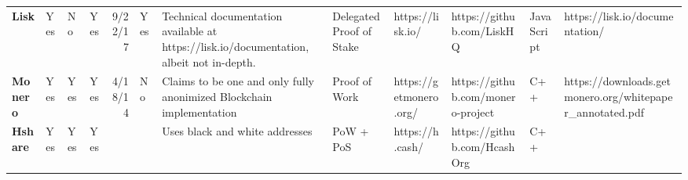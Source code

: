 \begin{table}[ht]
\begin{adjustbox}{width=25cm, height=6cm, angle=270}
\begin{tabular}{llllrlp{17.915em}rlrrr}
      \rowcolor[rgb]{ .267,  .447,  .769} \textcolor[rgb]{ 1,  1,  1}{\textbf{Lisk}} & \cellcolor[rgb]{ .776,  .937,  .808}\textcolor[rgb]{ 0,  .38,  0}{Yes} & \cellcolor[rgb]{ 1,  .78,  .808}\textcolor[rgb]{ .612,  0,  .024}{No} & \cellcolor[rgb]{ .776,  .937,  .808}\textcolor[rgb]{ 0,  .38,  0}{Yes} & \cellcolor[rgb]{ 1,  1,  1}9/22/17 & \cellcolor[rgb]{ .776,  .937,  .808}\textcolor[rgb]{ 0,  .38,  0}{Yes} & \cellcolor[rgb]{ .851,  .882,  .949}\textcolor[rgb]{ .188,  .329,  .588}{Technical documentation available at https://lisk.io/documentation, albeit not in-depth.} & \multicolumn{1}{l}{\cellcolor[rgb]{ .851,  .882,  .949}\textcolor[rgb]{ .188,  .329,  .588}{Delegated Proof of Stake}} & \cellcolor[rgb]{ 1,  1,  1}https://lisk.io/ & \multicolumn{1}{l}{\cellcolor[rgb]{ 1,  1,  1}https://github.com/LiskHQ} & \multicolumn{1}{l}{\cellcolor[rgb]{ .851,  .882,  .949}\textcolor[rgb]{ .188,  .329,  .588}{JavaScript}} & \multicolumn{1}{l}{\cellcolor[rgb]{ 1,  1,  1}https://lisk.io/documentation/} \\
      \rowcolor[rgb]{ .267,  .447,  .769} \textcolor[rgb]{ 1,  1,  1}{\textbf{Monero}} & \cellcolor[rgb]{ .776,  .937,  .808}\textcolor[rgb]{ 0,  .38,  0}{Yes} & \cellcolor[rgb]{ .776,  .937,  .808}\textcolor[rgb]{ 0,  .38,  0}{Yes} & \cellcolor[rgb]{ .776,  .937,  .808}\textcolor[rgb]{ 0,  .38,  0}{Yes} & \cellcolor[rgb]{ .851,  .882,  .949}\textcolor[rgb]{ .188,  .329,  .588}{4/18/14} & \cellcolor[rgb]{ 1,  .78,  .808}\textcolor[rgb]{ .612,  0,  .024}{No} & \cellcolor[rgb]{ 1,  1,  1}\textcolor[rgb]{ .188,  .329,  .588}{Claims to be one and only fully anonimized Blockchain implementation} & \multicolumn{1}{l}{\cellcolor[rgb]{ .851,  .882,  .949}\textcolor[rgb]{ .188,  .329,  .588}{Proof of Work}} & \cellcolor[rgb]{ .851,  .882,  .949}\textcolor[rgb]{ .188,  .329,  .588}{https://getmonero.org/} & \multicolumn{1}{l}{\cellcolor[rgb]{ .851,  .882,  .949}\textcolor[rgb]{ .188,  .329,  .588}{https://github.com/monero-project}} & \multicolumn{1}{l}{\cellcolor[rgb]{ .851,  .882,  .949}\textcolor[rgb]{ .188,  .329,  .588}{C++}} & \multicolumn{1}{l}{\cellcolor[rgb]{ .851,  .882,  .949}\textcolor[rgb]{ .188,  .329,  .588}{https://downloads.getmonero.org/whitepaper\_annotated.pdf}} \\
      \rowcolor[rgb]{ .267,  .447,  .769} \textcolor[rgb]{ 1,  1,  1}{\textbf{Hshare}} & \cellcolor[rgb]{ .776,  .937,  .808}\textcolor[rgb]{ 0,  .38,  0}{Yes} & \cellcolor[rgb]{ .776,  .937,  .808}\textcolor[rgb]{ 0,  .38,  0}{Yes} & \cellcolor[rgb]{ .776,  .937,  .808}\textcolor[rgb]{ 0,  .38,  0}{Yes} & \cellcolor[rgb]{ 1,  1,  1} & \cellcolor[rgb]{ 1,  1,  1} & \cellcolor[rgb]{ .851,  .882,  .949}\textcolor[rgb]{ .188,  .329,  .588}{Uses black and white addresses} & \multicolumn{1}{l}{\cellcolor[rgb]{ .851,  .882,  .949}\textcolor[rgb]{ .188,  .329,  .588}{PoW + PoS}} & \cellcolor[rgb]{ 1,  1,  1}https://h.cash/ & \multicolumn{1}{l}{\cellcolor[rgb]{ 1,  1,  1}https://github.com/HcashOrg} & \multicolumn{1}{l}{\cellcolor[rgb]{ .851,  .882,  .949}\textcolor[rgb]{ .188,  .329,  .588}{C++}} & \cellcolor[rgb]{ 1,  1,  1} \\

\end{tabular}
\end{adjustbox}
\end{table}
